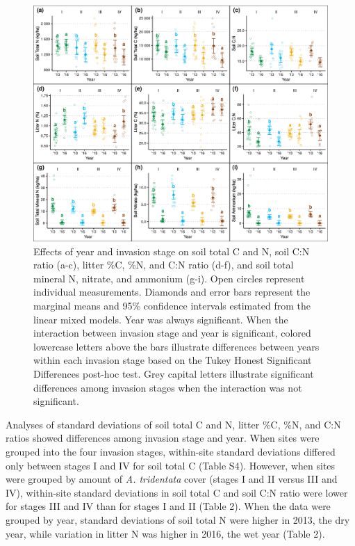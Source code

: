 \documentclass[
  11pt,
  a4paper,
]{article}
\begin{document}
\begin{figure}
\centering
\includegraphics{figures/tidy_soilvars_year.png}
\caption{Effects of year and invasion stage on soil total C and N, soil C:N ratio (a-c), litter \%C, \%N, and C:N ratio (d-f), and soil total mineral N, nitrate, and ammonium (g-i). Open circles represent individual measurements. Diamonds and error bars represent the marginal means and 95\% confidence intervals estimated from the linear mixed models. Year was always significant. When the interaction between invasion stage and year is significant, colored lowercase letters above the bars illustrate differences between years within each invasion stage based on the Tukey Honest Significant Differences post-hoc test. Grey capital letters illustrate significant differences among invasion stages when the interaction was not significant.}
\end{figure}

Analyses of standard deviations of soil total C and N, litter \%C, \%N, and C:N ratios showed differences among invasion stage and year. When sites were grouped into the four invasion stages, within-site standard deviations differed only between stages I and IV for soil total C (Table S4). However, when sites were grouped by amount of \emph{A. tridentata} cover (stages I and II versus III and IV), within-site standard deviations in soil total C and soil C:N ratio were lower for stages III and IV than for stages I and II (Table 2). When the data were grouped by year, standard deviations of soil total N were higher in 2013, the dry year, while variation in litter N was higher in 2016, the wet year (Table 2).
\end{document}
